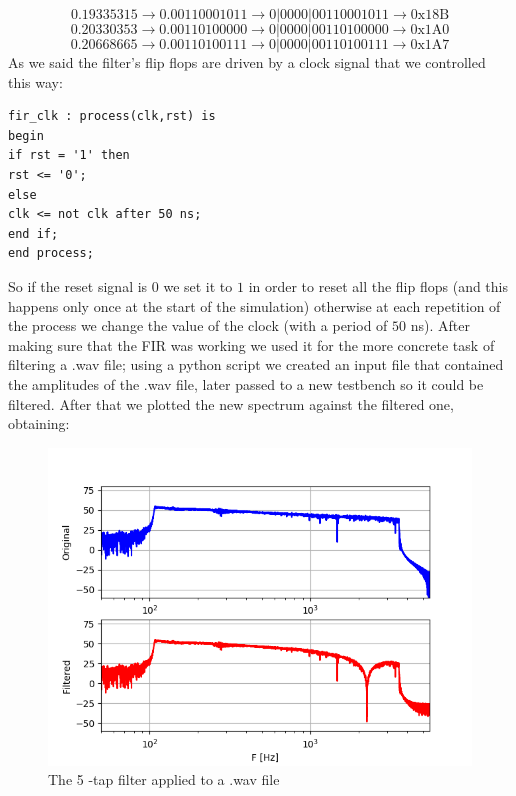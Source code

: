 \documentclass[a4paper,12pt]{article}
\begin{document}
$$0.19335315 \to 0.00110001011 \to 0|0000|00110001011 \to \textrm{0x18B}$$
$$0.20330353 \to 0.00110100000 \to 0|0000|00110100000 \to \textrm{0x1A0}$$
$$0.20668665 \to 0.00110100111 \to 0|0000|00110100111 \to \textrm{0x1A7}$$
As we said the filter's flip flops are driven by a clock signal that we controlled this way:
\begin{lstlisting}[style=vhdl]
fir_clk : process(clk,rst) is
begin
if rst = '1' then
rst <= '0';
else
clk <= not clk after 50 ns;
end if;
end process;
\end{lstlisting}
So if the reset signal is $0$ we set it to $1$ in order to reset all the flip flops (and this happens only once at the start of the simulation) otherwise at each repetition of the process we change the value of the clock (with a period of $50$ ns). After making sure that the FIR was working we used it for the more concrete task of filtering a .wav file; using a python script we created an input file that contained the amplitudes of the .wav file, later passed to a new testbench so it could be filtered. After that we plotted the new spectrum against the filtered one, obtaining:
\begin{figure}[h!]
	\begin{center}
		\includegraphics[width=0.6\linewidth,keepaspectratio]{f_spectrum.png}
	\end{center}	
	\caption{The 5 -tap filter applied to a .wav file}
	\label{fig:fir5ex}
\end{figure}
\end{document}
